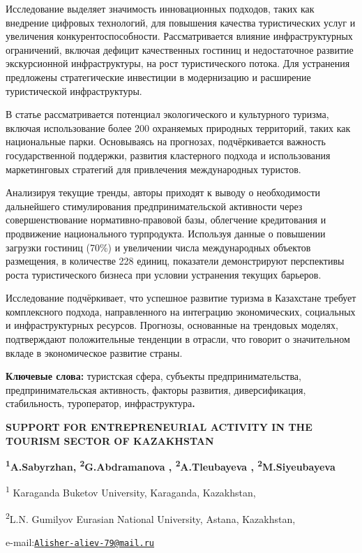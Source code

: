 Исследование выделяет значимость инновационных подходов, таких как
внедрение цифровых технологий, для повышения качества туристических
услуг и увеличения конкурентоспособности. Рассматривается влияние
инфраструктурных ограничений, включая дефицит качественных гостиниц и
недостаточное развитие экскурсионной инфраструктуры, на рост
туристического потока. Для устранения предложены стратегические
инвестиции в модернизацию и расширение туристической инфраструктуры.

В статье рассматривается потенциал экологического и культурного туризма,
включая использование более 200 охраняемых природных территорий, таких
как национальные парки. Основываясь на прогнозах, подчёркивается
важность государственной поддержки, развития кластерного подхода и
использования маркетинговых стратегий для привлечения международных
туристов.

Анализируя текущие тренды, авторы приходят к выводу о необходимости
дальнейшего стимулирования предпринимательской активности через
совершенствование нормативно-правовой базы, облегчение кредитования и
продвижение национального турпродукта. Используя данные о повышении
загрузки гостиниц (70\%) и увеличении числа международных объектов
размещения, в количестве 228 единиц, показатели демонстрируют
перспективы роста туристического бизнеса при условии устранения текущих
барьеров.

Исследование подчёркивает, что успешное развитие туризма в Казахстане
требует комплексного подхода, направленного на интеграцию экономических,
социальных и инфраструктурных ресурсов. Прогнозы, основанные на
трендовых моделях, подтверждают положительные тенденции в отрасли, что
говорит о значительном вкладе в экономическое развитие страны.

{\bfseries Ключевые слова:} туристская сфера, субъекты предпринимательства,
предпринимательская активность, факторы развития, диверсификация,
стабильность, туроператор, инфраструктура{\bfseries .}
\begin{articleheader}

{\bfseries SUPPORT FOR ENTREPRENEURIAL ACTIVITY IN THE TOURISM SECTOR OF
KAZAKHSTAN}

{\bfseries \textsuperscript{1}A.Sabyrzhan\textsuperscript{\envelope },
\textsuperscript{2}G.Abdramanova , \textsuperscript{2}A.Tleubayeva ,
\textsuperscript{2}M.Siyeubayeva}
\end{articleheader}
\begin{affiliation}

\textsuperscript{1} Karaganda Buketov University, Karaganda, Kazakhstan,

\textsuperscript{2}L.N. Gumilyov Eurasian National University, Astana,
Kazakhstan,

e-mail:\href{mailto:Alisher-aliev-79@mail.ru}{\nolinkurl{Alisher-aliev-79@mail.ru}}
\end{affiliation}

